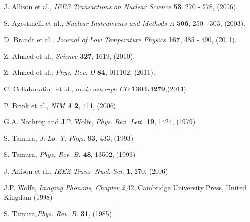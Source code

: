\documentclass[preprint,12pt]{elsarticle}
\begin{document}

\begin{thebibliography}{99}


J. Allison et al., {\it IEEE Transactions on Nuclear Science} \textbf{53}, 270 - 278, (2006).

S. Agostinelli et al., {\it Nuclear Instruments and Methods A} \textbf{506}, 250 - 303, (2003).

D. Brandt et al., {\it Journal of Low Temperature Physics} \textbf{167}, 485 - 490, (2011).


Z. Ahmed et al., {\it Science} \textbf{327}, 1619, (2010).

Z. Ahmed et al., {\it Phys. Rev. D} \textbf{84}, 011102, (2011).

C. Collaboration et al., {\it arxiv astro-ph.CO} \textbf{1304.4279},(2013)





P. Brink et al., {\it NIM A} \textbf{2}, 414, (2006)


G.A. Nothrop and J.P. Wolfe, {\it Phys. Rev. Lett.} \textbf{19}, 1424, (1979)

S. Tamura, {\it J. Lo. T. Phys.} \textbf{93}, 433, (1993)

S. Tamura, {\it Phys. Rev. B.} \textbf{48}, 13502, (1993)

J. Allison et al., {\it IEEE Trans. Nucl. Sci.} \textbf{1}, 270, (2006)


J.P. Wolfe, {\it Imaging Phonons, Chapter 2},42, Cambridge University Press, United Kingdom (1998) 

S. Tamura,{\it Phys. Rev. B.} \textbf{31}, (1985)





\end{thebibliography}
\end{document}
